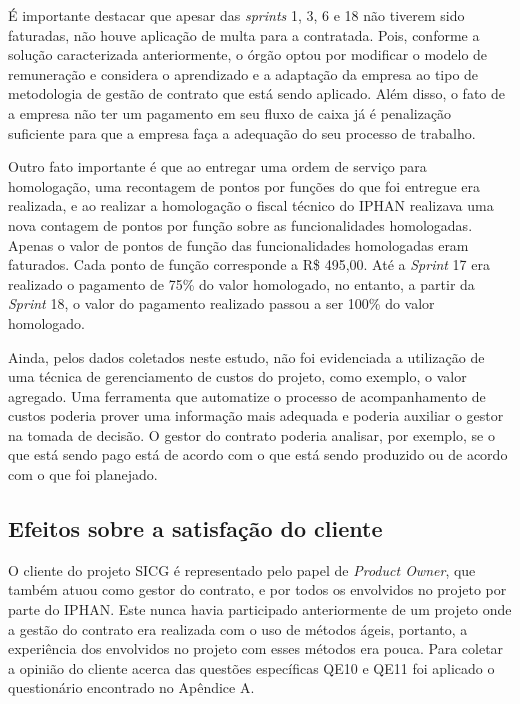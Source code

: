 É importante destacar que apesar das \textit{sprints} 1, 3, 6 e 18 não tiverem sido faturadas, não houve aplicação de multa para a contratada. Pois, conforme a solução caracterizada anteriormente, o órgão optou por modificar o modelo de remuneração e considera o aprendizado e a adaptação da empresa ao tipo de metodologia de gestão de contrato que está sendo aplicado. Além disso, o fato de a empresa não ter um pagamento em seu fluxo de caixa já é penalização suficiente para que a empresa faça a adequação do seu processo de trabalho.

Outro fato importante é que ao entregar uma ordem de serviço para homologação, uma recontagem de pontos por funções do que foi entregue era realizada, e ao realizar a homologação o fiscal técnico do IPHAN realizava uma nova contagem de pontos por função sobre as funcionalidades homologadas. Apenas o valor de pontos de função das funcionalidades homologadas eram faturados. Cada ponto de função corresponde a R\$ 495,00. Até a \textit{Sprint} 17 era realizado o pagamento de 75\% do valor homologado, no entanto, a partir da \textit{Sprint} 18, o valor do pagamento realizado passou a ser 100\% do valor homologado.

Ainda, pelos dados coletados neste estudo, não foi evidenciada a utilização de uma técnica de gerenciamento de custos do projeto, como exemplo, o valor agregado. Uma ferramenta que automatize o processo de acompanhamento de custos poderia prover uma informação mais adequada e poderia auxiliar o gestor na tomada de decisão. O gestor do contrato poderia analisar, por exemplo, se o que está sendo pago está de acordo com o que está sendo produzido ou de acordo com o que foi planejado.

\subsection[Efeitos sobre a satisfação do cliente]{Efeitos sobre a satisfação do cliente}

O cliente do projeto SICG é representado pelo papel de \textit{Product Owner}, que também atuou como gestor do contrato, e por todos os envolvidos no projeto por parte do IPHAN. Este nunca havia participado anteriormente de um projeto onde a gestão do contrato era realizada com o uso de métodos ágeis, portanto, a experiência dos envolvidos no projeto com esses métodos era pouca. Para coletar a opinião do cliente acerca das questões específicas QE10  e QE11 foi aplicado o questionário encontrado no Apêndice A.

